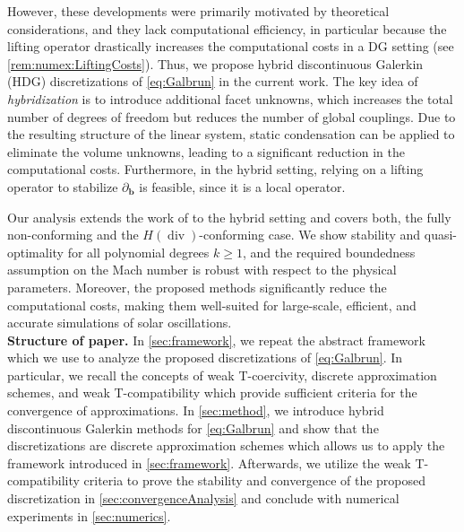 \documentclass{m2an}
\newcommand{\bflow}{\mathbf{b}}
\renewcommand{\div}{\operatorname{div}}
\newcommand{\diffb}{\partial_{\bflow}}
\theoremstyle{plain}
\theoremstyle{definition}
\begin{document}
However, these developments were primarily motivated by theoretical considerations, and they lack computational efficiency, in particular because the lifting operator drastically increases the computational costs in a DG  setting (see \cref{rem:numex:LiftingCosts}). Thus, we propose hybrid discontinuous Galerkin (HDG) discretizations of \eqref{eq:Galbrun} in the current work. The key idea of \emph{hybridization} \cite{CGL09,Leh10} is to introduce additional facet unknowns, which increases the total number of degrees of freedom but reduces the number of global couplings. Due to the resulting structure of the linear system, static condensation can be applied to eliminate the volume unknowns, leading to a significant reduction in the computational costs. Furthermore, in the hybrid setting, relying on a lifting operator to stabilize $\diffb$ is feasible, since it is a local operator.

Our analysis extends the work of \cite{H23Hdiv,Thesis_vB23} to the hybrid setting and covers both, the fully non-conforming and the $H(\div)$-conforming case. We show stability and quasi-optimality for all polynomial degrees $k \ge 1$, and the required boundedness assumption on the Mach number is robust with respect to the physical parameters. 
Moreover, the proposed methods significantly reduce the computational costs, making them well-suited for large-scale, efficient, and accurate simulations of solar oscillations. \\



\textbf{Structure of paper.} In \cref{sec:framework}, we repeat the abstract framework which we use to analyze the proposed discretizations of \eqref{eq:Galbrun}. In particular, we recall the concepts of weak T-coercivity, discrete approximation schemes, and weak T-compatibility which provide sufficient criteria for the convergence of approximations. In \cref{sec:method}, we introduce hybrid discontinuous Galerkin methods for \eqref{eq:Galbrun} and show that the discretizations are discrete approximation schemes which allows us to apply the framework introduced in \cref{sec:framework}. Afterwards, we utilize the weak T-compatibility criteria to prove the stability and convergence of the proposed discretization in \cref{sec:convergenceAnalysis}  and conclude with numerical experiments in \cref{sec:numerics}.
\end{document}
